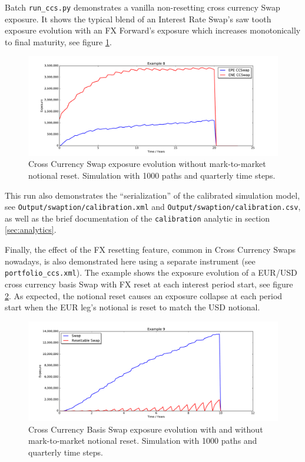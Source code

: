 Batch {\tt run\_ccs.py} demonstrates a vanilla non-resetting cross currency Swap exposure.
It shows the typical blend of an Interest Rate Swap's saw tooth exposure evolution with an FX Forward's exposure
which increases monotonically to final maturity, see
figure \ref{fig_6}.
\begin{figure}[h!]
\begin{center}
\includegraphics[scale=0.45]{examples/mpl_ccswap.pdf}
\end{center}
\caption{Cross Currency Swap exposure evolution without mark-to-market notional reset. Simulation with 1000 paths and
  quarterly time steps.}
\label{fig_6}
\end{figure}

This run also demonstrates the ``serialization'' of the calibrated simulation model, see {\tt Output/swaption/calibration.xml}
and {\tt Output/swaption/calibration.csv}, as well as the brief documentation of the {\tt calibration} analytic
in section \ref{sec:analytics}.

Finally, the effect of the FX resetting feature, common in Cross Currency Swaps nowadays, is also demonstrated here using a
separate instrument (see {\tt portfolio\_ccs.xml}).
The example shows the exposure evolution of a EUR/USD cross currency basis Swap with FX reset at each interest period
start, see figure \ref{fig_6b}. As expected, the notional reset causes an exposure collapse at each period start when
the EUR leg's notional is reset to match the USD notional.
\begin{figure}[h!]
\begin{center}
\includegraphics[scale=0.45]{examples/mpl_xccy_reset.pdf}
\end{center}
\caption{Cross Currency Basis Swap exposure evolution with and without mark-to-market notional reset. Simulation with
  1000 paths and quarterly time steps.}
\label{fig_6b}
\end{figure}

